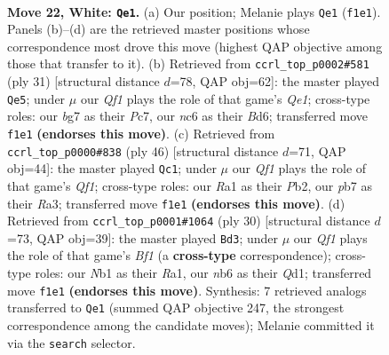 \documentclass[11pt]{article}
\begin{document}
\clearpage

\begin{figure}[p]\centering
\begin{subfigure}{0.46\textwidth}\centering
\resizebox{\linewidth}{!}{%
\newchessgame
\chessboard[
  setfen={r5k1/pp3pb1/1nn2qp1/3p1b1p/3P4/1B4BP/PPN2PP1/RN3QK1 w - - 0 22},
  showmover=false,
  pgfstyle=straightmove, color=movearrow, markmove={f1-e1}
]}
\caption{}
\end{subfigure}\hfill
\begin{subfigure}{0.46\textwidth}\centering
\resizebox{\linewidth}{!}{%
\newchessgame
\chessboard[
  setfen={r1b1q1k1/1pp2pp1/3b2np/3n4/pP1N4/2P5/P1QN1PPP/R1B2BK1 b - - 0 16},
  showmover=false,
  pgfstyle=straightmove, color=movearrow, markmove={e8-e5}
]}
\caption{}
\end{subfigure}
\\[4pt]
\begin{subfigure}{0.46\textwidth}\centering
\resizebox{\linewidth}{!}{%
\newchessgame
\chessboard[
  setfen={3q1bk1/r4p2/p2p1npp/P1pP1b2/2B5/R1N4P/1P1B1PP1/5QK1 w - - 3 24},
  showmover=false,
  pgfstyle=straightmove, color=movearrow, markmove={f1-c1}
]}
\caption{}
\end{subfigure}\hfill
\begin{subfigure}{0.46\textwidth}\centering
\resizebox{\linewidth}{!}{%
\newchessgame
\chessboard[
  setfen={r1bq2k1/ppp2pp1/2n4p/3p1n2/3P1B2/P1P2N1P/P4PP1/R2Q1BK1 w - - 2 16},
  showmover=false,
  pgfstyle=straightmove, color=movearrow, markmove={f1-d3}
]}
\caption{}
\end{subfigure}
\caption{\textbf{Move 22, White: \texttt{Qe1}.} (a) Our position; Melanie plays \texttt{Qe1} (\texttt{f1e1}). Panels (b)--(d) are the retrieved master positions whose correspondence most drove this move (highest QAP objective among those that transfer to it). (b) Retrieved from \texttt{ccrl\_top\_p0002\#581} (ply 31) [structural distance $d$=78, QAP obj=62]: the master played \texttt{Qe5}; under $\mu$ our \emph{Qf1} plays the role of that game's \emph{Qe1}; cross-type roles: our \emph{b}g7 as their \emph{P}c7, our \emph{n}c6 as their \emph{B}d6; transferred move \texttt{f1e1} \textbf{(endorses this move)}. (c) Retrieved from \texttt{ccrl\_top\_p0000\#838} (ply 46) [structural distance $d$=71, QAP obj=44]: the master played \texttt{Qc1}; under $\mu$ our \emph{Qf1} plays the role of that game's \emph{Qf1}; cross-type roles: our \emph{R}a1 as their \emph{P}b2, our \emph{p}b7 as their \emph{R}a3; transferred move \texttt{f1e1} \textbf{(endorses this move)}. (d) Retrieved from \texttt{ccrl\_top\_p0001\#1064} (ply 30) [structural distance $d$=73, QAP obj=39]: the master played \texttt{Bd3}; under $\mu$ our \emph{Qf1} plays the role of that game's \emph{Bf1} (a \textbf{cross-type} correspondence); cross-type roles: our \emph{N}b1 as their \emph{R}a1, our \emph{n}b6 as their \emph{Q}d1; transferred move \texttt{f1e1} \textbf{(endorses this move)}. Synthesis: 7 retrieved analogs transferred to \texttt{Qe1} (summed QAP objective 247, the strongest correspondence among the candidate moves); Melanie committed it via the \texttt{search} selector.}
\label{fig:thought-m42}
\end{figure}
\end{document}
